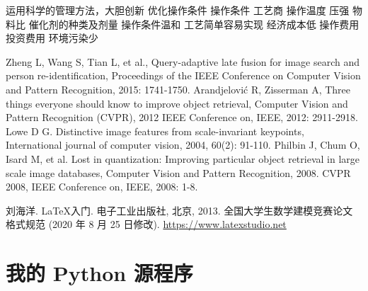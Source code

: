 \documentclass[bwprint]{gmcmthesis}
\begin{document}


运用科学的管理方法，大胆创新 优化操作条件 操作条件 工艺商
操作温度 压强 物料比 催化剂的种类及剂量 
操作条件温和 工艺简单容易实现 经济成本低 操作费用 投资费用 环境污染少 

\newpage



\begin{thebibliography}{99}  
Zheng L, Wang S, Tian L, et al., Query-adaptive late fusion for image search and person re-identification, Proceedings of the IEEE Conference on Computer Vision and Pattern Recognition, 2015: 1741-1750.  
Arandjelović R, Zisserman A, Three things everyone should know to improve object retrieval, Computer Vision and Pattern Recognition (CVPR), 2012 IEEE Conference on, IEEE, 2012: 2911-2918.  
Lowe D G. Distinctive image features from scale-invariant keypoints, International journal of computer vision, 2004, 60(2): 91-110.  
Philbin J, Chum O, Isard M, et al. Lost in quantization: Improving particular object retrieval in large scale image databases, Computer Vision and Pattern Recognition, 2008. CVPR 2008, IEEE Conference on, IEEE, 2008: 1-8.  
\end{thebibliography}



% 
% 


\begin{thebibliography}{9}%
    刘海洋.
    \newblock \LaTeX {}入门\allowbreak[J].
    \newblock 电子工业出版社, 北京, 2013.
    全国大学生数学建模竞赛论文格式规范 (2020 年 8 月 25 日修改).
     \url{https://www.latexstudio.net}
\end{thebibliography}






\newpage
\appendix
\section{我的 Python 源程序}
\begin{lstlisting}[language=Python]%设置不同语言即可。



 \end{lstlisting}
\end{document}
